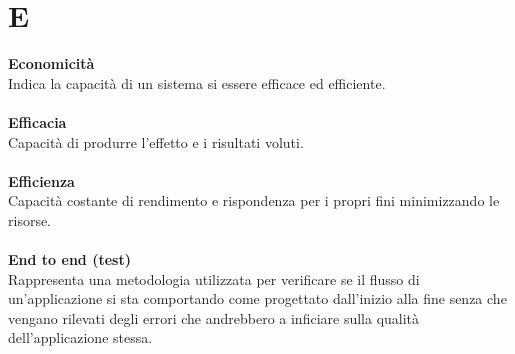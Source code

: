 \section{E}
\textbf{Economicità}\\
Indica la capacità di un sistema si essere efficace ed efficiente.\\ \\
\textbf{Efficacia}\\
Capacità di produrre l'effetto e i risultati voluti. \\ \\
\textbf{Efficienza}\\
Capacità costante di rendimento e rispondenza per i propri fini minimizzando le risorse. \\ \\
\textbf{End to end (test)}\\
Rappresenta una metodologia utilizzata per verificare se il flusso di un'applicazione si sta comportando come progettato dall'inizio alla fine senza che vengano rilevati degli errori che andrebbero a inficiare sulla qualità dell’applicazione stessa. \\ \\
\clearpage